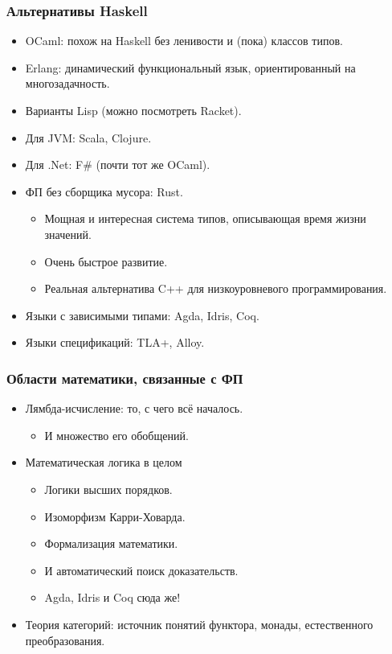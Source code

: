 \documentclass[11pt]{beamer}
\begin{document}
\begin{frame}[fragile]
  \frametitle{Альтернативы Haskell}
  \begin{itemize}
    \item OCaml: похож на Haskell без ленивости и (пока) классов типов.
    \item Erlang: динамический функциональный язык, ориентированный на многозадачность.
    \item Варианты Lisp (можно посмотреть Racket).
          \pause
    \item Для JVM: Scala, Clojure.
    \item Для .Net: F\# (почти тот же OCaml).
          \pause
    \item ФП без сборщика мусора: Rust.
          \begin{itemize}
            \item Мощная и интересная система типов, описывающая время жизни значений.
            \item Очень быстрое развитие.
            \item Реальная альтернатива C++ для низкоуровневого программирования.
          \end{itemize}
          \pause
    \item Языки с зависимыми типами: Agda, Idris, Coq.
          \pause
    \item Языки спецификаций: TLA+, Alloy.
  \end{itemize}
\end{frame}

\begin{frame}[fragile]
  \frametitle{Области математики, связанные с ФП}
  \begin{itemize}
    \item Лямбда-исчисление: то, с чего всё началось.
          \begin{itemize}
            \item И множество его обобщений.
          \end{itemize}
          \pause
    \item Математическая логика в целом
          \begin{itemize}
            \item Логики высших порядков.
            \item Изоморфизм Карри-Ховарда.
            \item Формализация математики.
            \item И автоматический поиск доказательств.
            \item Agda, Idris и Coq сюда же!
          \end{itemize}
          \pause
    \item Теория категорий: источник понятий функтора, монады, естественного преобразования.
  \end{itemize}
\end{frame}
\end{document}
